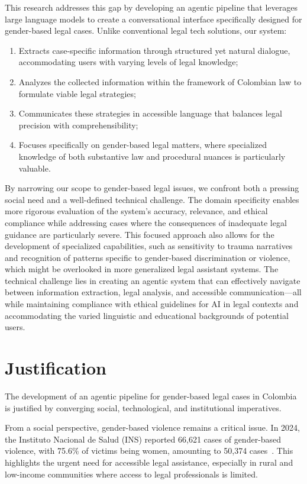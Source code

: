 This research addresses this gap by developing an agentic pipeline 
that leverages large language models to create a conversational 
interface specifically designed for gender-based legal cases. 
Unlike conventional legal tech solutions, our system:
\begin{enumerate}
\item Extracts case-specific information through structured yet natural dialogue, accommodating users with varying levels of legal knowledge;
\item Analyzes the collected information within the framework of Colombian law to formulate viable legal strategies;
\item Communicates these strategies in accessible language that balances legal precision with comprehensibility;
\item Focuses specifically on gender-based legal matters, where specialized knowledge of both substantive law and procedural nuances is particularly valuable.
\end{enumerate}
By narrowing our scope to gender-based legal issues, 
we confront both a pressing social need and a well-defined 
technical challenge. The domain specificity enables more 
rigorous evaluation of the system's accuracy, relevance, 
and ethical compliance while addressing cases where the 
consequences of inadequate legal guidance are particularly severe. 
This focused approach also allows for the development of specialized capabilities, 
such as sensitivity to trauma narratives and recognition of patterns specific to 
gender-based discrimination or violence, which might be overlooked in more generalized 
legal assistant systems.
The technical challenge lies in creating an agentic system 
that can effectively navigate between information extraction, 
legal analysis, and accessible communication—all while 
maintaining compliance with ethical guidelines for AI in 
legal contexts and accommodating the varied 
linguistic and educational backgrounds of potential users.
\section{Justification}
The development of an agentic pipeline for gender-based legal 
cases in Colombia is justified by converging social, technological, 
and institutional imperatives.

From a social perspective, gender-based violence remains a 
critical issue. In 2024, the Instituto Nacional de Salud (INS) 
reported 66,621 cases of gender-based violence, with 75.6\% of 
victims being women, amounting to 50,374 cases~\cite{ins2024}. 
This highlights the urgent need for accessible legal assistance, 
especially in rural and low-income communities where access to 
legal professionals is limited.

